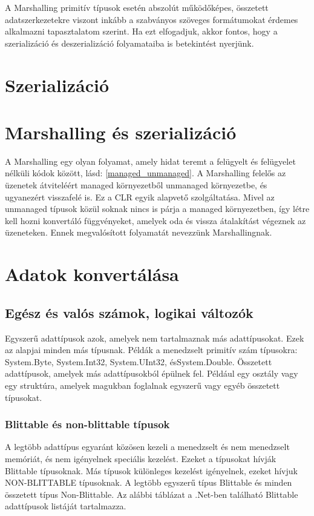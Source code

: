 \documentclass[tocnopagenum]{thesis-ekf}
\theoremstyle{definition}
\theoremstyle{remark}
\begin{document}
	A Marshalling primitív típusok esetén abszolút működőképes, összetett adatszerkezetekre viszont inkább a szabványos szöveges formátumokat érdemes alkalmazni tapasztalatom szerint. Ha ezt elfogadjuk, akkor fontos, hogy a szerializáció és deszerializáció folyamataiba is betekintést nyerjünk.
	\section{Szerializáció}
	\cite{sof_serialization}
	\section{Marshalling és szerializáció}
		A Marshalling egy olyan folyamat, amely hidat teremt a felügyelt és felügyelet nélküli kódok között, lásd: \ref{managed_unmanaged}. A Marshalling felelős az üzenetek átviteléért managed környezetből unmanaged környezetbe, és ugyanezért visszafelé is. Ez a CLR egyik alapvető szolgáltatása. Mivel az unmanaged típusok közül soknak nincs is párja a managed környezetben, így létre kell hozni konvertáló függvényeket, amelyek oda és vissza átalakítást végeznek az üzeneteken. Ennek megvalósított folyamatát nevezzünk Marshallingnak.
		\cite{marshalling_serialization}
	\section{Adatok konvertálása}
	\subsection{Egész és valós számok, logikai változók}
	Egyszerű adattípusok azok, amelyek nem tartalmaznak más adattípusokat. Ezek az alapjai minden más típusnak. Példák a menedzselt primitív szám típusokra: System.Byte, System.Int32, System.UInt32, ésSystem.Double.
	Összetett adattípusok, amelyek más adattípusokból épülnek fel. Például egy osztály vagy egy struktúra, amelyek magukban foglalnak egyszerű vagy egyéb összetett típusokat.
	\cite{marsh}
	\subsubsection{Blittable és non-blittable típusok}
	A legtöbb adattípus egyaránt közösen kezeli a menedzselt és nem menedzselt memóriát, és nem igényelnek speciális kezelést. Ezeket a típusokat hívják Blittable típusoknak. Más típusok különleges kezelést igényelnek, ezeket hívjuk NON-BLITTABLE típusoknak. A legtöbb egyszerű típus Blittable és minden összetett típus Non-Blittable. Az alábbi táblázat a .Net-ben található Blittable adattípusok listáját tartalmazza.
	
\end{document}
